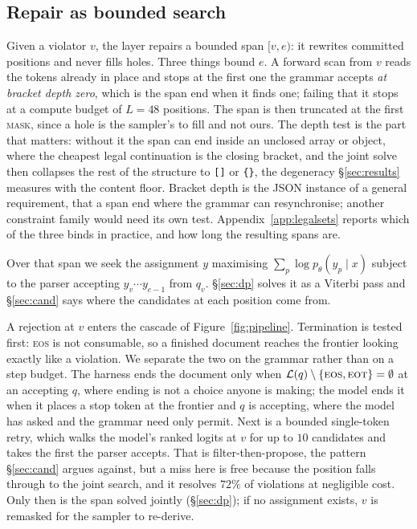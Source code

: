 \documentclass{article}
\begin{document}
\subsection{Repair as bounded search}
\label{sec:repair}

Given a violator $v$, the layer repairs a bounded span $[v,e)$: it rewrites
committed positions and never fills holes. Three things bound $e$. A forward scan
from $v$ reads the tokens already in place and stops at the first one the grammar
accepts \emph{at bracket depth zero}, which is the span end when it finds one;
failing that it stops at a compute budget of $L=48$ positions. The span is then
truncated at the first \textsc{mask}, since a hole is the sampler's to fill and
not ours. The depth test is the part that matters: without it the span can end
inside an unclosed array or object, where the cheapest legal continuation is the
closing bracket, and the joint solve then collapses the rest of the structure to
\texttt{[]} or \texttt{\{\}}, the degeneracy \S\ref{sec:results} measures with
the content floor. Bracket depth is the JSON instance of a general requirement, that a span end
where the grammar can resynchronise; another constraint family would need its own
test. Appendix~\ref{app:legalsets} reports which of the three binds
in practice, and how long the resulting spans are.

Over that span we seek the assignment $y$ maximising
$\sum_{p}\log p_\theta(y_p\mid x)$ subject to the parser accepting
$y_v\cdots y_{e-1}$ from $q_v$. \S\ref{sec:dp} solves it as a Viterbi pass and
\S\ref{sec:cand} says where the candidates at each position come from.

\label{sec:stop}%
A rejection at $v$ enters the cascade of Figure~\ref{fig:pipeline}. Termination
is tested first: \textsc{eos} is not consumable, so a finished document reaches
the frontier looking exactly like a violation. We separate the two on the grammar
rather than on a step budget. The harness ends the document only when
$\mathcal{L}(q)\setminus\{\textsc{eos},\textsc{eot}\}=\emptyset$ at an
accepting $q$, where ending is not a choice anyone is making; the model ends it
when it places a stop token at the frontier and $q$ is accepting, where the model
has asked and the grammar need only permit. Next is a bounded single-token retry,
which walks the model's ranked logits at $v$ for up to $10$ candidates and takes
the first the parser accepts. That is filter-then-propose, the pattern
\S\ref{sec:cand} argues against, but a miss here is free because the position
falls through to the joint search, and it resolves $72\%$ of violations at
negligible cost. Only then is the span solved jointly (\S\ref{sec:dp}); if no
assignment exists, $v$ is remasked for the sampler to re-derive.
\end{document}
